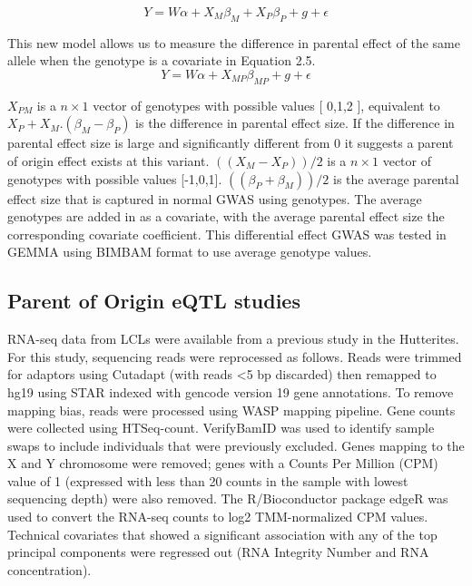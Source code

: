 \begin{equation}
Y =W\alpha + X_{M}\beta_{M}+ X_{P}\beta_{P}+g+\epsilon
\end{equation}

This new model allows us to measure the difference in parental effect of the same allele when the genotype is a covariate in Equation 2.5. 
\begin{equation}
Y =W\alpha + X_{MP}\beta_{MP}+g+\epsilon
\end{equation}

$X_{PM}$ is a $n \times 1$ vector of genotypes with possible values [ 0,1,2 ], equivalent to $X_P+ X_M. (\beta_M-\beta_P )$ is the difference in parental effect size. If the difference in parental effect size is large and significantly different from 0 it suggests a parent of origin effect exists at this variant. $((X_M-X_P ))/2$ is a $n \times 1$ vector of genotypes with possible values [-1,0,1].  $((\beta_P+\beta_M))/2$   is the average parental effect size that is captured in normal GWAS using genotypes. The average genotypes are added in as a covariate, with the average parental effect size the corresponding covariate coefficient. This differential effect GWAS was tested in GEMMA using BIMBAM format to use average genotype values\cite{Servin:2007gj}.


\subsection{Parent of Origin eQTL studies}\label{Parent of Origin eQTL studies}

RNA-seq data from LCLs were available from a previous study in the Hutterites\cite{Cusanovich:2016id}. For this study, sequencing reads were reprocessed as follows. Reads were trimmed for adaptors using Cutadapt (with reads \textless5 bp discarded) then remapped to hg19 using STAR indexed with gencode version 19 gene annotations\cite{Dobin:2002by,Martin:2011eu}. To remove mapping bias, reads were processed using WASP mapping pipeline\cite{vandeGeijn:2015hi}. Gene counts were collected using HTSeq-count\cite{Anders:2015gf}. VerifyBamID was used to identify sample swaps to include individuals that were previously excluded\cite{Jun:2012je}. Genes mapping to the X and Y chromosome were removed; genes with a Counts Per Million (CPM) value of 1 (expressed with less than 20 counts in the sample with lowest sequencing depth) were also removed. The R/Bioconductor package edgeR was used to convert the RNA-seq counts to log2 TMM-normalized CPM values\cite{Robinson:2010dd,Robinson:2010cw}. Technical covariates that showed a significant association with any of the top principal components were regressed out (RNA Integrity Number and RNA concentration).



